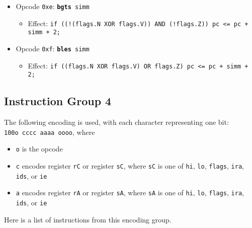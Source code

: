 \documentclass{article}
\begin{document}
\begin{itemize}
		\item Opcode \texttt{0xe}:
			\texttt{\textbf{bgts} simm}
		\begin{itemize}
			\item Effect:
				\texttt{if ((!(flags.N XOR flags.V)) AND (!flags.Z))
					pc <= pc + simm + 2;}
		\end{itemize}

		\item Opcode \texttt{0xf}:
			\texttt{\textbf{bles} simm}
		\begin{itemize}
			\item Effect:
				\texttt{if ((flags.N XOR flags.V) OR flags.Z)
					pc <= pc + simm + 2;}
		\end{itemize}
	\end{itemize}

	\doublespacing
	\subsection{Instruction Group 4}
	The following encoding is used, with each character representing one
	bit:  \\
	\texttt{100o cccc aaaa oooo}, where

	\singlespacing
	\begin{itemize}
		\item \texttt{o} is the opcode
		\item \texttt{c} encodes register \texttt{rC} or register
		\texttt{sC}, where \texttt{sC} is one of \texttt{hi}, \texttt{lo},
		\texttt{flags}, \texttt{ira}, \texttt{ids}, or \texttt{ie}
		\item \texttt{a} encodes register \texttt{rA} or register
		\texttt{sA}, where \texttt{sA} is one of \texttt{hi}, \texttt{lo},
		\texttt{flags}, \texttt{ira}, \texttt{ids}, or \texttt{ie}
	\end{itemize}
	\doublespacing

	Here is a list of instructions from this encoding group.
\end{document}
